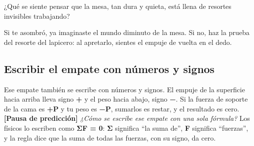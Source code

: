 \documentclass[
  spanish,
  letterpaper,
  12pt,
  oneside,
  open=any,
  DIV=15]{scrbook}
\begin{document}
\begin{tcolorbox}[enhanced jigsaw, arc=.35mm, bottomrule=.15mm, bottomtitle=1mm, breakable, colback=white, colbacktitle=quarto-callout-note-color!10!white, colframe=quarto-callout-note-color-frame, coltitle=black, left=2mm, leftrule=.75mm, opacityback=0, opacitybacktitle=0.6, rightrule=.15mm, title=\textcolor{quarto-callout-note-color}{\faInfo}\hspace{0.5em}{Pregunta socioemocional}, titlerule=0mm, toprule=.15mm, toptitle=1mm]

¿Qué se siente pensar que la mesa, tan dura y quieta, está llena de
resortes invisibles trabajando?

\end{tcolorbox}

\begin{tcolorbox}[enhanced jigsaw, arc=.35mm, bottomrule=.15mm, bottomtitle=1mm, breakable, colback=white, colbacktitle=quarto-callout-tip-color!10!white, colframe=quarto-callout-tip-color-frame, coltitle=black, left=2mm, leftrule=.75mm, opacityback=0, opacitybacktitle=0.6, rightrule=.15mm, title=\textcolor{quarto-callout-tip-color}{\faLightbulb}\hspace{0.5em}{Sobre la pregunta socioemocional}, titlerule=0mm, toprule=.15mm, toptitle=1mm]

Si te asombró, ya imaginaste el mundo diminuto de la mesa. Si no, haz la
prueba del resorte del lapicero: al apretarlo, sientes el empuje de
vuelta en el dedo.

\end{tcolorbox}

\subsection{Escribir el empate con números y
signos}\label{escribir-el-empate-con-nuxfameros-y-signos-1}

Ese empate también se escribe con números y signos. El empuje de la
superficie hacia arriba lleva signo \textcolor[HTML]{7C3AED}{\textbf{+}}
y el peso hacia abajo, signo \textcolor[HTML]{2563EB}{\textbf{−}}. Si la
fuerza de soporte de la cama es \textcolor[HTML]{7C3AED}{\textbf{+P}} y
tu peso es \textcolor[HTML]{2563EB}{\textbf{−P}}, sumarlos es restar, y
el resultado es cero. \textbf{{[}Pausa de predicción{]}} \emph{¿Cómo se
escribe ese empate con una sola fórmula?} Los físicos lo escriben como
\textbf{ΣF = 0}: \textbf{Σ} significa ``la suma de'', \textbf{F}
significa ``fuerzas'', y la regla dice que la suma de todas las fuerzas,
con su signo, da cero.
\end{document}
